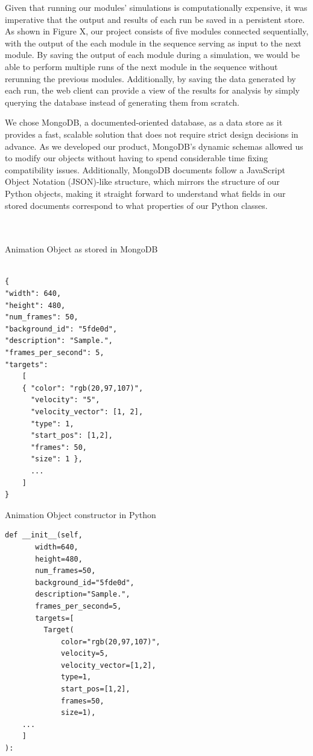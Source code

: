 \documentclass[a4paper,11pt]{article}
\begin{document}
Given that running our modules' simulations is computationally expensive, it was imperative that the output and results of each run be saved in a persistent store. As shown in Figure X, our project consists of five modules connected sequentially, with the output of the each module in the sequence serving as input to the next module. By saving the output of each module during a simulation, we would be able to perform multiple runs of the next module in the sequence without rerunning the previous modules. Additionally, by saving the data generated by each run, the web client can provide a view of the results for analysis by simply querying the database instead of generating them from scratch.

We chose MongoDB, a documented-oriented database, as a data store as it provides a fast, scalable solution that does not require strict design decisions in advance. As we developed our product, MongoDB's dynamic schemas allowed us to modify our objects without having to spend considerable time fixing compatibility issues. Additionally, MongoDB documents follow a JavaScript Object Notation (JSON)-like structure, which mirrors the structure of our Python objects, making it straight forward to understand what fields in our stored documents correspond to what properties of our Python classes.\\
\\
\\
\begin{minipage}[t]{0.5\textwidth}
\centering  
Animation Object as stored in MongoDB
\begin{verbatim}
  
{
"width": 640,
"height": 480,
"num_frames": 50,
"background_id": "5fde0d",
"description": "Sample.",
"frames_per_second": 5,
"targets":
	[
	{ "color": "rgb(20,97,107)",
	  "velocity": "5",
	  "velocity_vector": [1, 2],
	  "type": 1,
	  "start_pos": [1,2],
	  "frames": 50,
	  "size": 1 },
	  ...
	]
}
\end{verbatim}
\end{minipage} 
\begin{minipage}[t]{0.5\textwidth}
\centering  
Animation Object constructor in Python
\begin{verbatim}	
def __init__(self,
  	   width=640,
  	   height=480,    
  	   num_frames=50,
  	   background_id="5fde0d",
  	   description="Sample.",
  	   frames_per_second=5,
  	   targets=[
  	     Target(
	         color="rgb(20,97,107)",
	         velocity=5,
	         velocity_vector=[1,2],
	         type=1,
	         start_pos=[1,2],
	         frames=50,
	         size=1),
	...
	]
):
\end{verbatim}
\end{minipage}
\end{document}

